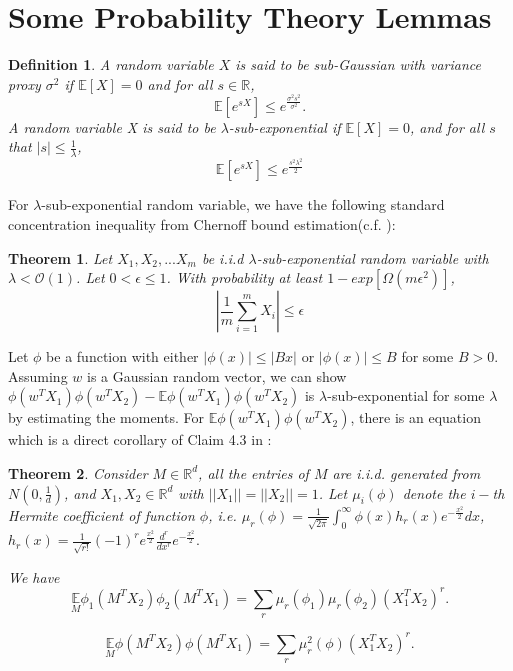 \documentclass{article}
\newcommand{\cO}{\mathcal{O}}
\newtheorem{theo}{\textbf{Theorem}}
\newtheorem{def1}{\textbf{Definition}}
\begin{document}
\section {Some Probability Theory Lemmas}
\begin{def1}
A random variable $X$ is said to be sub-Gaussian with variance proxy $\sigma^2$ if $ \mathbb{E}[X]=0$ and for all $s\in\mathbb{R}$,
\begin{equation}
\mathbb{E}[e^{sX}]\leq e^{\frac{\sigma^2s^2}{\sigma^2}}.
\end{equation}
A random variable X is said to be $\lambda$-sub-exponential if $ \mathbb{E}[X]=0$, and for all $s$ that $|s|\leq \frac{1}{\lambda}$,
\begin{equation}
\mathbb{E}[e^{sX}]\leq e^{\frac{s^2\lambda^2}{2}}
\end{equation}
\end{def1}
For  $\lambda$-sub-exponential  random variable, we have the following standard concentration inequality from Chernoff bound estimation(c.f. \cite{2013Concentration}):
\begin{theo}\label{ci}
Let $X_1,X_2,...X_m$ be i.i.d $\lambda$-sub-exponential  random variable with $\lambda<\cO(1)$. Let $0<\epsilon\leq 1$. With probability at least $1-exp[\Omega(m\epsilon^2)]$,
\begin{equation}
|\frac{1}{m}\sum_{i=1}^mX_i|\leq \epsilon
\end{equation}
\end{theo}
Let $\phi$ be a function with either $|\phi(x)|\leq |Bx|$ or $|\phi(x)|\leq B$  for some $B>0$. Assuming $w$ is a Gaussian random vector, we can show $\phi(w^TX_1)\phi(w^TX_2)-\mathbb{E}\phi(w^TX_1)\phi(w^TX_2)$ is $\lambda$-sub-exponential for some $\lambda$ by estimating the moments. For $\mathbb{E}\phi(w^TX_1)\phi(w^TX_2)$, there is an equation which is a direct corollary of  Claim 4.3 in \cite{171100501}:
\begin{theo}\label{nei}
Consider $M\in \mathbb{R}^d$, all  the entries of $M$ are i.i.d. generated from $N(0,\frac{1}{d})$, and $X_1,X_2\in\mathbb{R}^d$ with $||X_1||=||X_2||=1$. Let $\mu_i(\phi)$ denote the $i-$th Hermite coefficient of function $\phi$, i.e.
$\mu_r(\phi)=\frac{1}{\sqrt{2\pi}}\int_0^\infty \phi(x)h_r(x)e^{-\frac{x^2}{2}}dx$, $h_r(x)=\frac{1}{\sqrt{r!}}(-1)^re^{\frac{x^2}{2}}\frac{d^r}{dx^r}e^{-\frac{x^2}{2}}.$

We have
\begin{equation}
\underset{M}{\mathbb{E}} \phi_1(M^TX_2)\phi_2(M^TX_1)=\sum_r \mu_r(\phi_1)\mu_r(\phi_2)(X_1^TX_2)^{r}.
\end{equation}

\begin{equation}
\underset{M}{\mathbb{E}} \phi(M^TX_2)\phi(M^TX_1)=\sum_r \mu^2_r(\phi)(X_1^TX_2)^{r}.
\end{equation}
\end{theo}
\end{document}
